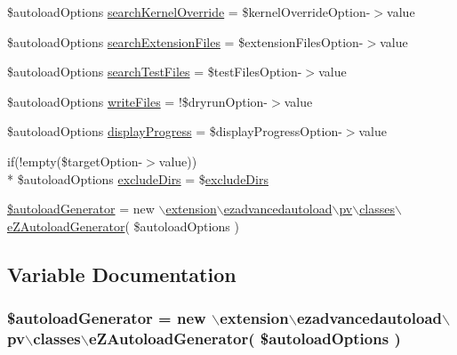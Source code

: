 \begin{DoxyCompactItemize}
\item 
\$autoload\-Options \hyperlink{ezpgenerateautoloads_8php_af86b9a19664645803f32b4d5bb872ff1}{search\-Kernel\-Override} = \$kernel\-Override\-Option-\/$>$value
\item 
\$autoload\-Options \hyperlink{ezpgenerateautoloads_8php_ae648f5335e57fa264ffaaf9d2fe4c61b}{search\-Extension\-Files} = \$extension\-Files\-Option-\/$>$value
\item 
\$autoload\-Options \hyperlink{ezpgenerateautoloads_8php_a3727c480754aa7c8b3dc7e8070ed1eb4}{search\-Test\-Files} = \$test\-Files\-Option-\/$>$value
\item 
\$autoload\-Options \hyperlink{ezpgenerateautoloads_8php_a210f8683b204a76199152312e3d9a177}{write\-Files} = !\$dryrun\-Option-\/$>$value
\item 
\$autoload\-Options \hyperlink{ezpgenerateautoloads_8php_aa79f55582aba2bd3eff4d3fa4b980a84}{display\-Progress} = \$display\-Progress\-Option-\/$>$value
\item 
if(!empty(\$target\-Option-\/$>$value)) \\*
\$autoload\-Options \hyperlink{ezpgenerateautoloads_8php_a52217447e9aa7d329a16ea69370b42a4}{exclude\-Dirs} = \$\hyperlink{ezpgenerateautoloads_8php_a52217447e9aa7d329a16ea69370b42a4}{exclude\-Dirs}
\item 
\hyperlink{ezpgenerateautoloads_8php_a86e95d193d321273aadaef08750683a8}{\$autoload\-Generator} = new $\backslash$\hyperlink{classextension_1_1ezadvancedautoload_1_1pv_1_1classes_1_1e_z_autoload_generator}{extension$\backslash$ezadvancedautoload$\backslash$pv$\backslash$classes$\backslash$e\-Z\-Autoload\-Generator}( \$autoload\-Options )
\end{DoxyCompactItemize}


\subsection{Variable Documentation}
\hypertarget{ezpgenerateautoloads_8php_a86e95d193d321273aadaef08750683a8}{
\subsubsection[{\$autoload\-Generator}]{\setlength{\rightskip}{0pt plus 5cm}\$autoload\-Generator = new $\backslash${\bf extension$\backslash$ezadvancedautoload$\backslash$pv$\backslash$classes$\backslash$e\-Z\-Autoload\-Generator}( \$autoload\-Options )}}\label{ezpgenerateautoloads_8php_a86e95d193d321273aadaef08750683a8}


